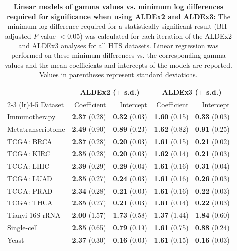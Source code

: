 \documentclass[10pt,letterpaper]{article}
\begin{document}
\begin{table}[H]
    \caption{\textbf{Linear models of gamma values vs. minimum log differences required for significance when using ALDEx2 and ALDEx3:} The minimum log difference required for a statistically significant result (BH-adjusted \textit{P}-value $<$0.05) was calculated for each iteration of the ALDEx2 and ALDEx3 analyses for all HTS datasets. Linear regression was performed on these minimum differences vs. the corresponding gamma values and the mean coefficients and intercepts of the models are reported. Values in parentheses represent standard deviations.}
    \centering
    \begin{tabular}{lrrrr}
         \toprule
         & \multicolumn{2}{c}{ALDEx2 ($\pm$ s.d.)} & \multicolumn{2}{c}{ALDEx3 ($\pm$ s.d.)}\\
         \cmidrule(lr){2-3} \cmidrule(lr){4-5}
         Dataset & Coefficient & Intercept & Coefficient & Intercept\\
         \midrule
         Immunotherapy & \textbf{2.37} (0.28) & \textbf{0.32} (0.03) & \textbf{1.60} (0.15) & \textbf{0.33} (0.03) \\
         Metatranscriptome & \textbf{2.49} (0.90) & \textbf{0.89} (0.23) & \textbf{1.62} (0.82) & \textbf{0.91} (0.25) \\
         TCGA: BRCA & \textbf{2.37} (0.28) & \textbf{0.20} (0.03) & \textbf{1.61} (0.15) & \textbf{0.21} (0.02) \\
         TCGA: KIRC & \textbf{2.35} (0.28) & \textbf{0.20} (0.03) & \textbf{1.62} (0.14) & \textbf{0.21} (0.03) \\
         TCGA: LIHC & \textbf{2.39} (0.29) & \textbf{0.29} (0.04) & \textbf{1.61} (0.16) & \textbf{0.31} (0.04) \\
         TCGA: LUAD & \textbf{2.35} (0.27) & \textbf{0.24} (0.03) & \textbf{1.61} (0.16) & \textbf{0.26} (0.03) \\
         TCGA: PRAD & \textbf{2.34} (0.28) & \textbf{0.21} (0.03) & \textbf{1.61} (0.16) & \textbf{0.22} (0.03) \\
         TCGA: THCA & \textbf{2.35} (0.27) & \textbf{0.21} (0.03) & \textbf{1.61} (0.14) & \textbf{0.22} (0.03) \\
         Tianyi 16S rRNA & \textbf{2.00} (1.57) & \textbf{1.73} (0.58) & \textbf{1.37} (1.44) & \textbf{1.84} (0.60) \\
         Single-cell & \textbf{2.35} (0.65) & \textbf{0.79} (0.19) & \textbf{1.61} (0.75) & \textbf{0.88} (0.24) \\
         Yeast & \textbf{2.37} (0.30) & \textbf{0.16} (0.03) & \textbf{1.61} (0.15) & \textbf{0.16} (0.03) \\
         \bottomrule
    \end{tabular}
    \label{tab:regression}
\end{table}
\end{document}
